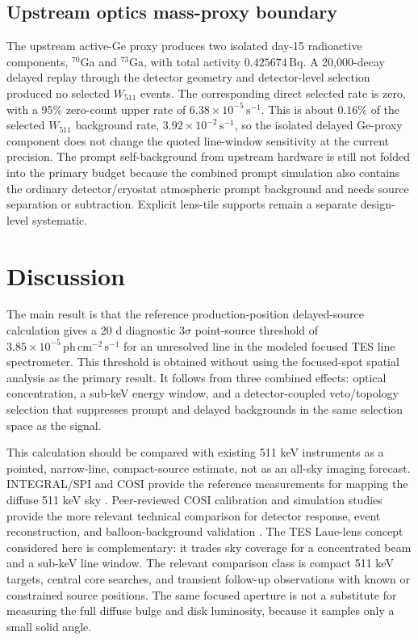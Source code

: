 \documentclass[preprint,12pt]{elsarticle}
\newcommand{\phcms}{\,\mathrm{ph\,cm^{-2}\,s^{-1}}}
\newcommand{\cps}{\,\mathrm{s^{-1}}}
\newcommand{\wii}{W_{511}}
\begin{document}
\subsection{Upstream optics mass-proxy boundary}
\label{subsec:upstream_optics_background}

The upstream active-Ge proxy produces two isolated day-15 radioactive components,
$^{70}$Ga and $^{73}$Ga, with total activity $0.425674\,\mathrm{Bq}$.
A 20,000-decay delayed replay through the detector geometry and detector-level
selection produced no selected $\wii$ events. The corresponding direct selected
rate is zero, with a 95\% zero-count upper rate of $6.38\times10^{-5}\cps$.
This is about $0.16\%$ of the selected $\wii$ background rate,
$3.92\times10^{-2}\cps$, so the isolated delayed Ge-proxy component does not change the
quoted line-window sensitivity at the current precision. The prompt
self-background from upstream hardware is still not folded into the primary
budget because the combined prompt simulation also contains the ordinary
detector/cryostat atmospheric prompt background and needs source separation
or subtraction. Explicit lens-tile supports remain a separate design-level
systematic.

\section{Discussion}
\label{sec:discussion}

The main result is that the reference production-position delayed-source calculation gives a 20 d diagnostic $3\sigma$ point-source threshold of $3.85\times10^{-5}\phcms$ for an unresolved line in the modeled focused TES line spectrometer. This threshold is obtained without using the focused-spot spatial analysis as the primary result. It follows from three combined effects: optical concentration, a sub-keV energy window, and a detector-coupled veto/topology selection that suppresses prompt and delayed backgrounds in the same selection space as the signal.

This calculation should be compared with existing 511 keV instruments as a pointed, narrow-line, compact-source estimate, not as an all-sky imaging forecast. INTEGRAL/SPI and COSI provide the reference measurements for mapping the diffuse 511 keV sky \cite{Siegert2016AA,Kierans2020,Siegert2020COSI,Yoneda2025}. Peer-reviewed COSI calibration and simulation studies provide the more relevant technical comparison for detector response, event reconstruction, and balloon-background validation \cite{Beechert2022,Sleator2019,Gallego2025Balloon,Ciabattoni2025ACS}. The TES Laue-lens concept considered here is complementary: it trades sky coverage for a concentrated beam and a sub-keV line window. The relevant comparison class is compact 511 keV targets, central core searches, and transient follow-up observations with known or constrained source positions. The same focused aperture is not a substitute for measuring the full diffuse bulge and disk luminosity, because it samples only a small solid angle.
\end{document}
